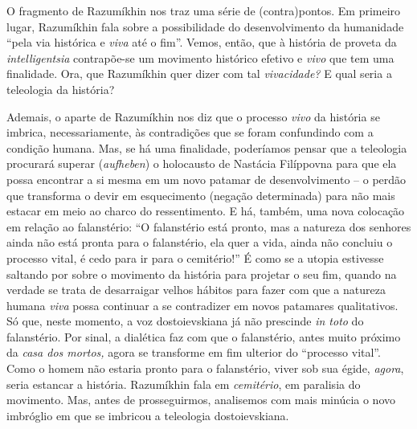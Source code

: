 O fragmento de Razumíkhin nos traz uma série de (contra)pontos. Em
primeiro lugar, Razumíkhin fala sobre a possibilidade do desenvolvimento
da humanidade ``pela via histórica e \emph{viva} até o fim''. Vemos,
então, que à história de proveta da \emph{intelligentsia} contrapõe-se
um movimento histórico efetivo e \emph{vivo} que tem uma finalidade.
Ora, que Razumíkhin quer dizer com tal \emph{vivacidade?} E qual seria a
teleologia da história?

Ademais, o aparte de Razumíkhin nos diz que o processo \emph{vivo} da
história se imbrica, necessariamente, às contradições que se foram
confundindo com a condição humana. Mas, se há uma finalidade, poderíamos
pensar que a teleologia procurará superar (\emph{aufheben}) o holocausto
de Nastácia Filíppovna para que ela possa encontrar a si mesma em um
novo patamar de desenvolvimento -- o perdão que transforma o devir em
esquecimento (negação determinada) para não mais estacar em meio ao
charco do ressentimento. E há, também, uma nova colocação em relação ao
falanstério: ``O falanstério está pronto, mas a natureza dos senhores
ainda não está pronta para o falanstério, ela quer a vida, ainda não
concluiu o processo vital, é cedo para ir para o cemitério!'' É como se
a utopia estivesse saltando por sobre o movimento da história para
projetar o seu fim, quando na verdade se trata de desarraigar velhos
hábitos para fazer com que a natureza humana \emph{viva} possa continuar
a se contradizer em novos patamares qualitativos. Só que, neste momento,
a voz dostoievskiana já não prescinde \emph{in toto} do falanstério. Por
sinal, a dialética faz com que o falanstério, antes muito próximo da
\emph{casa dos mortos,} agora se transforme em fim ulterior do
``processo vital''. Como o homem não estaria pronto para o falanstério,
viver sob sua égide, \emph{agora}, seria estancar a história. Razumíkhin
fala em \emph{cemitério}, em paralisia do movimento. Mas, antes de
prosseguirmos, analisemos com mais minúcia o novo imbróglio em que se
imbricou a teleologia dostoievskiana.

